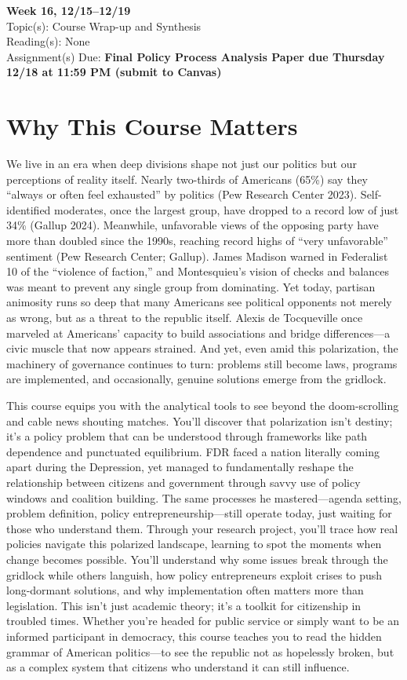 \documentclass[12pt]{article}     %
\begin{document}
\noindent \textbf{Week 16, 12/15--12/19}\\
Topic(s): Course Wrap-up and Synthesis\\
Reading(s): None\\
Assignment(s) Due: \textbf{Final Policy Process Analysis Paper due Thursday 12/18 at 11:59 PM (submit to Canvas)}\\

\section{Why This Course Matters}

  We live in an era when deep divisions shape not just our politics but our perceptions of reality itself. Nearly two-thirds of Americans (65\%) say they ``always or often feel exhausted'' by politics (Pew Research Center 2023). Self-identified moderates, once the largest group, have dropped to a record low of just 34\% (Gallup 2024). Meanwhile, unfavorable views of the opposing party have more than doubled since the 1990s, reaching record highs of “very unfavorable” sentiment (Pew Research Center; Gallup). James Madison warned in Federalist 10 of the “violence of faction,” and Montesquieu's vision of checks and balances was meant to prevent any single group from dominating. Yet today, partisan animosity runs so deep that many Americans see political opponents not merely as wrong, but as a threat to the republic itself. Alexis de Tocqueville once marveled at Americans' capacity to build associations and bridge differences—a civic muscle that now appears strained. And yet, even amid this polarization, the machinery of governance continues to turn: problems still become laws, programs are implemented, and occasionally, genuine solutions emerge from the gridlock.

  This course equips you with the analytical tools to see beyond the doom-scrolling and cable news shouting matches. You'll discover that polarization isn't destiny; it's a policy problem that can be understood through frameworks like path dependence and punctuated equilibrium. FDR faced a nation literally coming apart during the Depression, yet managed to fundamentally reshape the relationship between citizens and government through savvy use of policy windows and coalition building. The same processes he mastered---agenda setting, problem definition, policy entrepreneurship---still operate today, just waiting for those who understand them. Through your research project, you'll trace how real policies navigate this polarized landscape, learning to spot the moments when change becomes possible. You'll understand why some issues break through the gridlock while others languish, how policy entrepreneurs exploit crises to push long-dormant solutions, and why implementation often matters more than legislation. This isn't just academic theory; it's a toolkit for citizenship in troubled times. Whether you're headed for public service or simply want to be an informed participant in democracy, this course teaches you to read the hidden grammar of American politics---to see the republic not as hopelessly broken, but as a complex system that citizens who understand it can still influence.
\end{document}
